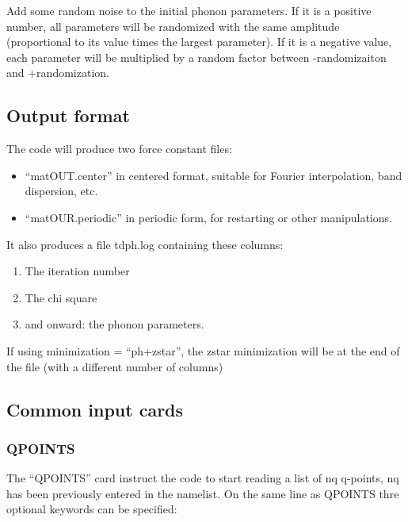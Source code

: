 \documentclass[
]{article}
\providecommand{\tightlist}{%
  \setlength{\itemsep}{0pt}\setlength{\parskip}{0pt}}
\begin{document}
Add some random noise to the initial phonon parameters. If it is a
positive number, all parameters will be randomized with the same
amplitude (proportional to its value times the largest parameter). If it
is a negative value, each parameter will be multiplied by a random
factor between -randomizaiton and +randomization.

\hypertarget{output-format-4}{%
\subsection{Output format}\label{output-format-4}}

The code will produce two force constant files:

\begin{itemize}
\tightlist
\item
  \enquote{matOUT.center} in centered format, suitable for Fourier
  interpolation, band dispersion, etc.
\item
  \enquote{matOUR.periodic} in periodic form, for restarting or other
  manipulations.
\end{itemize}

It also produces a file tdph.log containing these columns:

\begin{enumerate}
\def\labelenumi{\arabic{enumi}.}
\tightlist
\item
  The iteration number
\item
  The chi square
\item
  and onward: the phonon parameters.
\end{enumerate}

If using minimization = \enquote{ph+zstar}, the zstar minimization will
be at the end of the file (with a different number of columns)

\hypertarget{common-input-cards}{%
\subsection{Common input cards}\label{common-input-cards}}

\hypertarget{qpoints}{%
\subsubsection{QPOINTS}\label{qpoints}}

The \enquote{QPOINTS} card instruct the code to start reading a list of
nq q-points, nq has been previously entered in the namelist. On the same
line as QPOINTS thre optional keywords can be specified:
\end{document}
